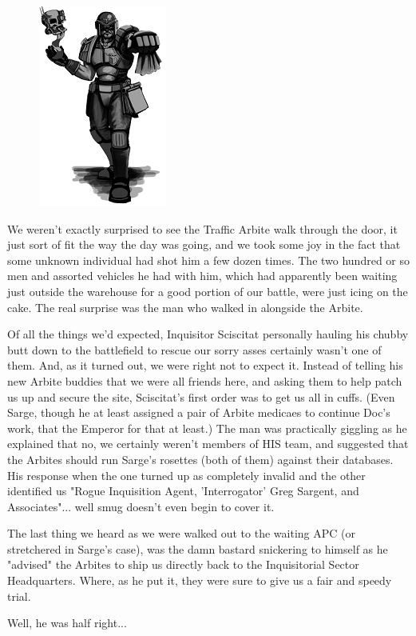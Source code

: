 \begin{figure}
	\begin{center}
		\includegraphics[width=\figwidth]{pics/19/58.png}
	\end{center}
\end{figure}
We weren't exactly surprised to see the Traffic Arbite walk through the door, it just sort of fit the way the day was going, and we took some joy in the fact that some unknown individual had shot him a few dozen times. 
The two hundred or so men and assorted vehicles he had with him, which had apparently been waiting just outside the warehouse for a good portion of our battle, were just icing on the cake. 
The real surprise was the man who walked in alongside the Arbite. 


Of all the things we'd expected, Inquisitor Sciscitat personally hauling his chubby butt down to the battlefield to rescue our sorry asses certainly wasn't one of them. 
And, as it turned out, we were right not to expect it. 
Instead of telling his new Arbite buddies that we were all friends here, and asking them to help patch us up and secure the site, Sciscitat's first order was to get us all in cuffs. 
(Even Sarge, though he at least assigned a pair of Arbite medicaes to continue Doc's work, that the Emperor for that at least.) The man was practically giggling as he explained that no, we certainly weren't members of HIS team, and suggested that the Arbites should run Sarge's rosettes (both of them) against their databases. 
His response when the one turned up as completely invalid and the other identified us "Rogue Inquisition Agent, 'Interrogator' Greg Sargent, and Associates"... 
well smug doesn't even begin to cover it.

The last thing we heard as we were walked out to the waiting APC (or stretchered in Sarge's case), was the damn bastard snickering to himself as he "advised" the Arbites to ship us directly back to the Inquisitorial Sector Headquarters. 
Where, as he put it, they were sure to give us a fair and speedy trial.

Well, he was half right...

